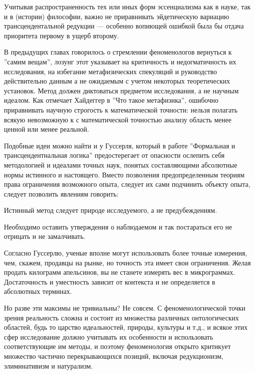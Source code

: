 \documentclass[11pt]{book}
\begin{document}
Учитывая распространенность тех или иных форм эссенциализма как в науке, так и в (истории) философии, важно не приравнивать эйдетическую вариацию трансцендентальной редукции --- особенно вопиющей ошибкой была бы отдача приоритета первому в ущерб второму.

В предыдущих главах говорилось о стремлении феноменологов вернуться к ''самим вещам'', лозунг этот указывает на критичность и недогматичность их исследования, на избегание метафизических спекуляций и руководство действительно данным а не ожидаемым с учетом некоторых теоретических установок. Метод должен диктоваться предметом исследования, а не научным идеалом. Как отмечает Хайдеггер в ''Что такое метафизика'', ошибочно приравнивать научную строгость к математической точности: нельзя полагать всякую невозможную к с математической точностью анализу область менее ценной или менее реальной.

Подобные идеи можно найти и у Гуссерля, который в работе ''Формальная и трансцендентнальная логика'' предостерегает от опасности ослепить себя методологией и идеалами точных наук, понятых составляющими абсолютные нормы истинного и настоящего. Вместо позволения предопределенным теориям права ограничения возможного опыта, следует их сами подчинить объекту опыта, следует позволить явлениям говорить:

\smallskip
{}\relax
{}\relax

Истинный метод следует природе исследуемого, а не предубеждениям.

Необходимо оставить утверждения о наблюдаемом и так постараться его не отрицать и не замалчивать.

\relax
{}\relax
\smallskip

Согласно Гуссерлю, ученые вполне могут использовать более точные измерения, чем, скажем, продавцы на рынке, но точность эта имеет свои ограничения. Желая продать килограмм апельсинов, вы не станете измерять вес в микрограммах. Достаточность и уместность зависит от контекста и не определяется в абсолютных терминах.

Но разве эти максимы не тривиальны? Не совсем. С феноменологической точки зрения реальность сложна и состоит из множества различных онтологических областей, будь то царство идеальностей, природы, культуры и т.д., и всякое этих сфер исследование должно учитывать их особенности и использовать соответствующие им методы, и поэтому феноменология открыто критикует множество частично перекрывающихся позиций, включая редукционизм, элиминативизм и натурализм.
\end{document}
